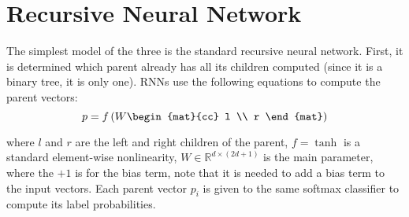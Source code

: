 \section{Recursive Neural Network}

The simplest model of the three is the standard recursive neural network. First,
it is determined which parent already has all its children computed (since it is
a binary tree, it is only one). RNNs use the following equations to compute the
parent vectors:
\begin{equation}
	p = f\left(W 
	\begin{mat}{cc}
			l  \\ 
			r 
	\end{mat}
	\right)
\end{equation}

where $l$ and $r$ are the left and right children of the parent, $f = \tanh$ is
a standard element-wise nonlinearity, $W \in \mathbb{R}^{d \times (2d + 1)}$ is 
the main parameter, where the $+1$ is for the bias term, note that it is needed
to add a bias term to the input vectors. Each parent vector $p_i$ is given to
the same softmax classifier to compute its label probabilities.

